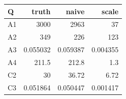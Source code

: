 \begin{tabular}{@{}lrrr@{}}\toprule
Q & truth & naive & scale \\\midrule
A1 & 3000 & 2963 & 37 \\
A2 & 349 & 226 & 123 \\
A3 & 0.055032 & 0.059387 & 0.004355 \\
A4 & 211.5 & 212.8 & 1.3 \\
C2 & 30 & 36.72 & 6.72 \\
C3 & 0.051864 & 0.050447 & 0.001417 \\
\bottomrule\end{tabular}
